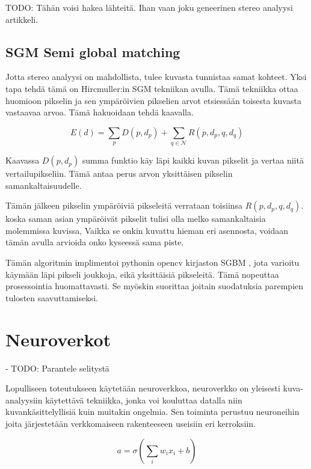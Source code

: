 TODO: Tähän voisi hakea lähteitä. Ihan vaan joku geneerinen stereo analyysi artikkeli.


\subsection{SGM Semi global matching}

Jotta stereo analyysi on mahdollista,
tulee kuvasta tunnistaa samat kohteet.
Yksi tapa tehdä tämä on Hircmuller:in SGM tekniikan avulla\cite{hirschmuller2005babel}.
Tämä tekniikka ottaa huomioon pikselin ja sen ympäröivien pikselien arvot etsiessään toisesta kuvasta vastaavaa arvoa. Tämä hakuoidaan tehdä kaavalla.

\begin{equation}\label{yht:SGM}
    E(d) = \sum_{p} D(p, d_p) + \sum_{q \in \mathcal{N}} R(p, d_p, q, d_q)
\end{equation}

Kaavassa \(D(p, d_p)\) summa funktio käy läpi kaikki kuvan pikselit ja vertaa niitä vertailupikseliin.
Tämä antaa perus arvon yksittäisen pikselin samankaltaisuudelle.

Tämän jälkeen pikselin ympäröiviä pikseleitä verrataan toisiinsa \(R(p, d_p, q, d_q)\).
koska saman asian ympäröivät pikselit tulisi olla melko samankaltaisia molemmissa kuvissa, 
Vaikka se onkin kuvattu hieman eri asennosta, voidaan tämän avulla arvioida onko kyseessä sama piste.

Tämän algoritmin implimentoi pythonin opencv kirjaston SGBM \cite{opencvsgbm},
jota varioitu käymään läpi pikseli joukkoja, eikä yksittäisiä pikseleitä.
Tämä nopeuttaa prosessointia huomattavasti.
Se myöskin suorittaa joitain suodatuksia parempien tulosten saavuttamiseksi.

\section{Neuroverkot}

- TODO: Parantele selitystä

Lopulliseen toteutukseen käytetään neuroverkkoa, neuroverkko on yleisesti kuva-analyysiin käytettävä tekniikka, jonka voi kouluttaa datalla niin kuvankäsittelyllisiä kuin muitakin ongelmia. Sen toiminta perustuu neuroneihin joita järjestetään verkkomaiseen rakenteeseen useisiin eri kerroksiin.

\begin{equation}\label{yht:neuroni}
    a = \sigma\left(\sum_i w_i x_i + b\right)
\end{equation}

